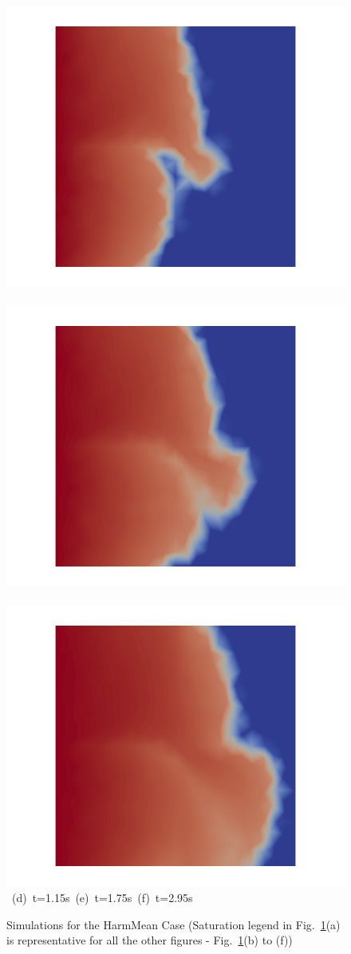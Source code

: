 \begin{landscape}
\begin{figure}[ht]
{\vspace{0.5cm}
\hbox{
      \includegraphics[width=.56\textwidth]{./Pics/HarmMeanCase/HarmMeanCase_Saturation_t_1dot15.png}
      \includegraphics[width=.56\textwidth]{./Pics/HarmMeanCase/HarmMeanCase_Saturation_t_1dot75.png} 
      \includegraphics[width=.56\textwidth]{./Pics/HarmMeanCase/HarmMeanCase_Saturation_t_2dot95.png}}
\vspace{0.cm}
\hbox{ \hspace{2.5cm} (d) t=1.15s \hspace{5.5cm} (e) t=1.75s   \hspace{5.5cm} (f) t=2.95s}
\vspace{0.cm}
}   
\caption{Simulations for the HarmMean Case (Saturation legend in Fig.~\ref{fig:HarmMeanCase_Saturation}(a) is representative for all the other figures - \ie Fig.~\ref{fig:HarmMeanCase_Saturation}(b) to (f))}
\label{fig:HarmMeanCase_Saturation}
\end{figure}
\end{landscape}
\clearpage





